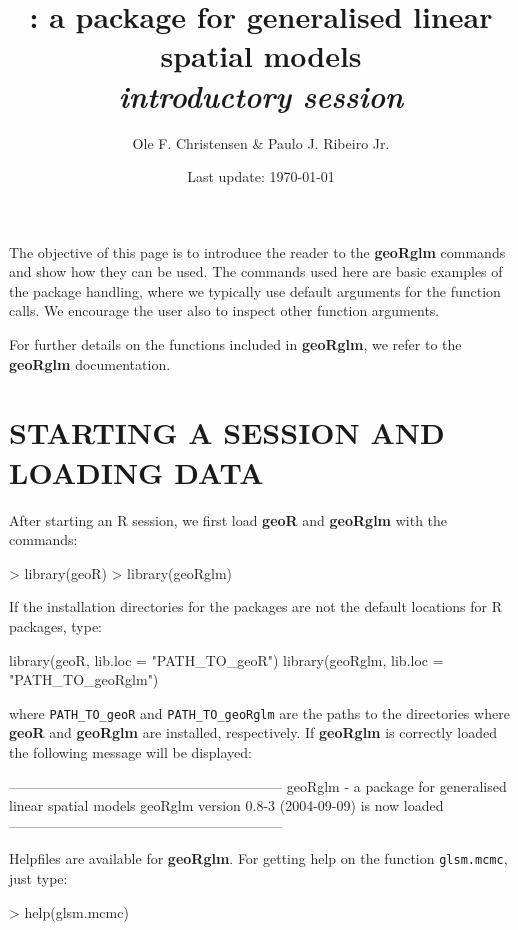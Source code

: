 \documentclass[12pt,a4paper]{article}
\title{\pkg{geoRglm} : a package for  generalised linear spatial models
\\{\it introductory session}}
\author{Ole F. Christensen \& Paulo J. Ribeiro Jr.}
\date{Last update: \today}
\newcommand{\strong}[1]{{\textbf{ #1}}}
\let\pkg=\strong
\newcommand{\code}[1]{\texttt{\small #1}}
\newcommand{\R}{{\textsf{R}}{}}
\begin{document}
\maketitle




The objective of this page is to introduce the reader to the 
\pkg{geoRglm} commands and show how they can be used.
The commands used here are basic examples of the package handling, where we typically use default arguments for the function calls.
We encourage the user also to inspect other function arguments.

For further details on the functions included in \pkg{geoRglm}, we refer to the \pkg{geoRglm} documentation.

\section{STARTING A SESSION AND LOADING DATA}
After starting an \R{} session, we first load \pkg{geoR} and \pkg{geoRglm} with the commands:
\begin{Schunk}
\begin{Sinput}
> library(geoR)
> library(geoRglm)
\end{Sinput}
\end{Schunk}

If the installation directories for the packages are not the default locations for \R{} packages, type:
\begin{Rin}
  library(geoR, lib.loc = "PATH_TO_geoR")
  library(geoRglm, lib.loc = "PATH_TO_geoRglm")
\end{Rin}
where \verb+PATH_TO_geoR+ and \verb+PATH_TO_geoRglm+ are the paths to the directories where \pkg{geoR} and \pkg{geoRglm} are installed, respectively.
If \pkg{geoRglm} is correctly loaded the following message will be displayed:
\begin{Schunk}
\begin{Soutput}
-----------------------------------------------------------
geoRglm - a package for generalised linear spatial models
geoRglm version 0.8-3 (2004-09-09) is now loaded
-----------------------------------------------------------
\end{Soutput}
\end{Schunk}
Helpfiles are available for \pkg{geoRglm}. For getting help on the function \code{glsm.mcmc}, just type:  
\begin{Rin}
> help(glsm.mcmc)
\end{Rin}
\end{document}

